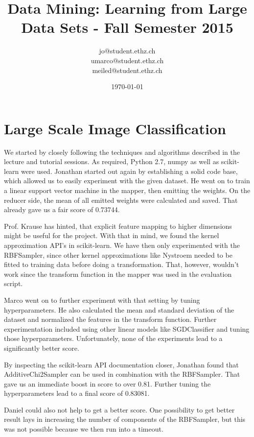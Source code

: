 \documentclass[a4paper, 11pt]{article}
\title{Data Mining: Learning from Large Data Sets - Fall Semester 2015}
\author{jo@student.ethz.ch\\ umarco@student.ethz.ch\\ meiled@student.ethz.ch\\}
\date{\today}
\begin{document}
\maketitle

\section*{Large Scale Image Classification}
We started by closely following the techniques and algorithms described in the lecture and tutorial sessions. As required, Python 2.7, numpy as well as scikit-learn were used.
Jonathan started out again by establishing a solid code base, which allowed us to easily experiment with the given dataset. He went on to train a linear support vector machine in the mapper, then emitting the weights. On the reducer side, the mean of all emitted weights were calculated and saved. That already gave us a fair score of 0.73744.

Prof. Krause has hinted, that explicit feature mapping to higher dimensions might be useful for the project. With that in mind, we found the kernel approximation API's in scikit-learn. We have then only experimented with the RBFSampler, since other kernel approximations like Nystroem needed to be fitted to training data before doing a transformation. That, however, wouldn't work since the transform function in the mapper was used in the evaluation script.

Marco went on to further experiment with that setting by tuning hyperparameters. He also calculated the mean and standard deviation of the dataset and normalized the features in the transform function. Further experimentation included using other linear models like SGDClassifier and tuning those hyperparameters. Unfortunately, none of the experiments lead to a significantly better score.

By inspecting the scikit-learn API documentation closer, Jonathan found that AdditiveChi2Sampler can be used in combination with the RBFSampler. That gave us an immediate boost in score to over 0.81. Further tuning the hyperparameters lead to a final score of 0.83081.

Daniel could also not help to get a better score. One possibility to get better result lays in increasing the number of components of the RBFSampler, but this was not possible because we then run into a timeout.
\end{document}
